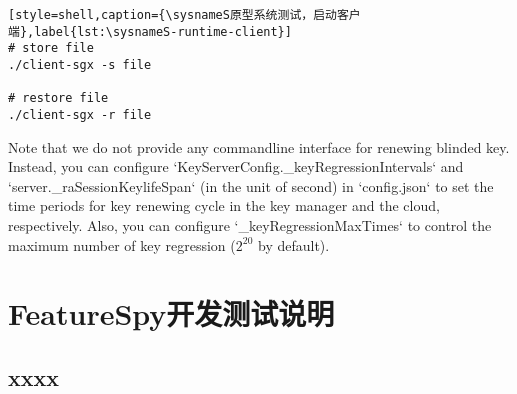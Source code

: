 \begin{lstlisting}[style=shell,caption={\sysnameS原型系统测试，启动客户端},label{lst:\sysnameS-runtime-client}]
# store file
./client-sgx -s file

# restore file
./client-sgx -r file
\end{lstlisting}

Note that we do not provide any commandline interface for renewing blinded key. Instead, you can configure `KeyServerConfig.\_keyRegressionIntervals` and `server.\_raSessionKeylifeSpan` (in the unit of second) in `config.json` to set the time periods for key renewing cycle in the key manager and the cloud, respectively. Also, you can configure `\_keyRegressionMaxTimes` to control the maximum number of key regression ($2^20$ by default).

\chapter{FeatureSpy开发测试说明}
\section{xxxx}